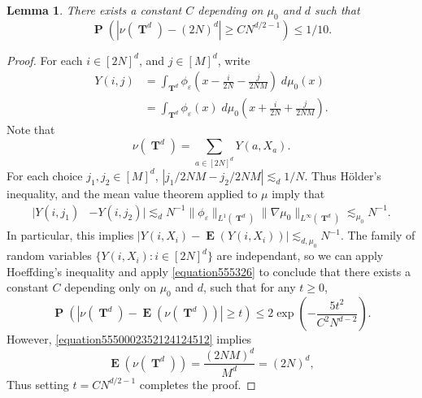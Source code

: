 \documentclass[12pt,reqno]{article}
\DeclareMathOperator{\TT}{\mathbf{T}}
\newtheorem{lemma}[theorem]{Lemma}
\DeclareMathOperator{\EE}{\mathbf{E}}
\DeclareMathOperator{\PP}{\mathbf{P}}
\begin{document}
\begin{lemma} \label{nuboundlemma}
    There exists a constant $C$ depending on $\mu_0$ and $d$ such that
    \[ \PP \left( |\nu(\TT^d) - (2N)^d | \geq C N^{d/2 - 1} \right) \leq 1/10. \]
\end{lemma}
\begin{proof}
    For each $i \in [2N]^d$, and $j \in [M]^d$, write
    \begin{equation}
    \begin{split}
        Y(i,j) &= \int_{\TT^d} \phi_\varepsilon \left( x - \frac{i}{2N} - \frac{j}{2NM} \right)\; d\mu_0(x)\\
        &= \int_{\TT^d} \phi_\varepsilon(x)\; d\mu_0 \left(x + \frac{i}{2N} + \frac{j}{2NM} \right).
    \end{split}
    \end{equation}
    Note that
    \begin{equation} \label{equation555326}
        \nu(\TT^d) = \sum_{a \in [2N]^d} Y(a,X_a).
    \end{equation}
    For each choice $j_1, j_2 \in [M]^d$, $|j_1/2NM - j_2/2NM| \lesssim_d 1/N$. Thus H\"{o}lder's inequality, and the mean value theorem applied to $\mu$ imply that
    \begin{equation} \label{equation774435}
    \begin{split}
        |Y(i,j_1) &- Y(i,j_2)| \lesssim_d N^{-1} \| \phi_\varepsilon \|_{L^1(\TT^d)} \| \nabla \mu_0 \|_{L^\infty(\TT^d)} \lesssim_{\mu_0} N^{-1}.
    \end{split}
    \end{equation}
    In particular, this implies $|Y(i,X_i) - \EE(Y(i,X_i))| \lesssim_{d,\mu_0} N^{-1}$. The family of random variables $\{ Y(i,X_i) : i \in [2N]^d \}$ are independant, so we can apply Hoeffding's inequality and apply \eqref{equation555326} to conclude that there exists a constant $C$ depending only on $\mu_0$ and $d$, such that for any $t \geq 0$,
    \begin{equation} \label{equation6653921}
        \PP \left( |\nu(\TT^d) - \EE(\nu(\TT^d))| \geq t \right) \leq 2 \exp \left( - \frac{5 t^2}{C^2 N^{d-2}} \right).
    \end{equation}
    However, \eqref{equation5550002352124124512} implies
    \begin{equation} \label{equation9102490120}
        \EE(\nu(\TT^d)) = \frac{(2NM)^d}{M^d} = (2N)^d,
    \end{equation}
    Thus setting $t = C N^{d/2 - 1}$ completes the proof.
\end{proof}
\end{document}
